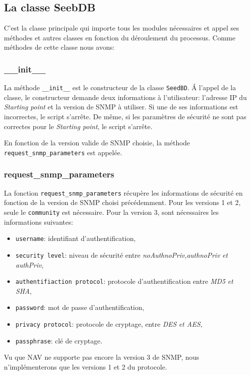 
\subsection{La classe SeebDB}
C'est la classe principale qui importe tous les modules nécessaires et appel ses méthodes et autres classes en fonction du déroulement du processus. Comme méthodes de cette classe nous avons:
\subsubsection{\_\_init\_\_}
La méthode \texttt{\_\_init\_\_} est le constructeur de la classe \texttt{SeedBD}. \'A l'appel de la classe, le constructeur demande deux informations à l'utilisateur: l'adresse IP du \emph{Starting point} et la version de SNMP à utiliser. Si une de ses informations est incorrectes, le script s'arrête. De même, si les paramètres de sécurité ne sont pas correctes pour le \emph{Starting point}, le script s'arrête.

En fonction de la version valide de SNMP choisie, la méthode \texttt{request\_snmp\_parameters} est appelée.
 
\subsubsection{request\_snmp\_parameters}
La fonction \texttt{request\_snmp\_parameters} récupère les informations de sécurité en fonction de la version de SNMP choisi précédemment. Pour les versions 1 et 2, seule le \texttt{community} est nécessaire. Pour la version 3, sont nécessaires les informations suivantes: 
\begin{itemize}
\item \texttt{username}: identifiant d'authentification,
\item \texttt{security level}: niveau de sécurité entre \emph{noAuthnoPriv,authnoPriv et authPriv},
\item \texttt{authentifiaction protocol}: protocole d'authentification entre \emph{MD5 et SHA},
\item \texttt{password}: mot de passe d'authentification,
\item \texttt{privacy protocol}: protocole de cryptage, entre \emph{DES et AES},
\item \texttt{passphrase}: clé de cryptage.
\end{itemize}

Vu que NAV ne supporte pas encore la version 3 de SNMP, nous n'implémenterons que les versions 1 et 2 du protocole.

